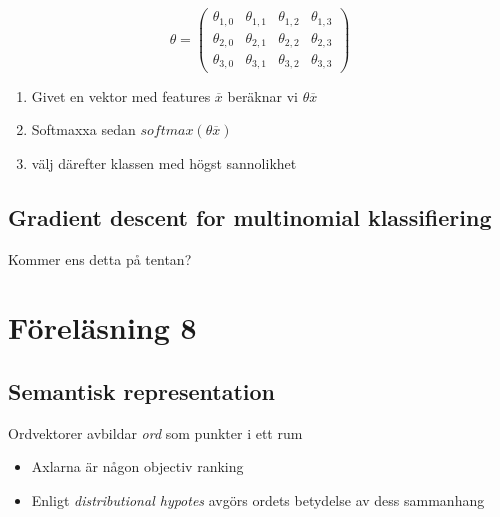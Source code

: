 \documentclass[12pt,a4paper]{article}
\begin{document}
$$\theta =
\begin{pmatrix}
\theta_{1,0} & \theta_{1,1} & \theta_{1,2} & \theta_{1,3} \\
\theta_{2,0} & \theta_{2,1} & \theta_{2,2} & \theta_{2,3} \\
\theta_{3,0} & \theta_{3,1} & \theta_{3,2} & \theta_{3,3}
\end{pmatrix}$$

\begin{enumerate}
    \item Givet en vektor med features $\overline{x}$ beräknar vi $\theta \overline{x}$
    \item Softmaxxa sedan $softmax(\theta \overline{x})$
    \item välj därefter klassen med högst sannolikhet
\end{enumerate}

\subsection*{Gradient descent for multinomial klassifiering}
Kommer ens detta på tentan?

\section*{Föreläsning 8}
\subsection*{Semantisk representation}
Ordvektorer avbildar \textit{ord} som punkter i ett rum
\begin{figure}[h]
    \centering %
\end{figure}
\begin{itemize}
    \item Axlarna är någon objectiv ranking
    \item Enligt \textit{distributional hypotes} avgörs ordets betydelse av dess sammanhang
\end{itemize}
\end{document}
